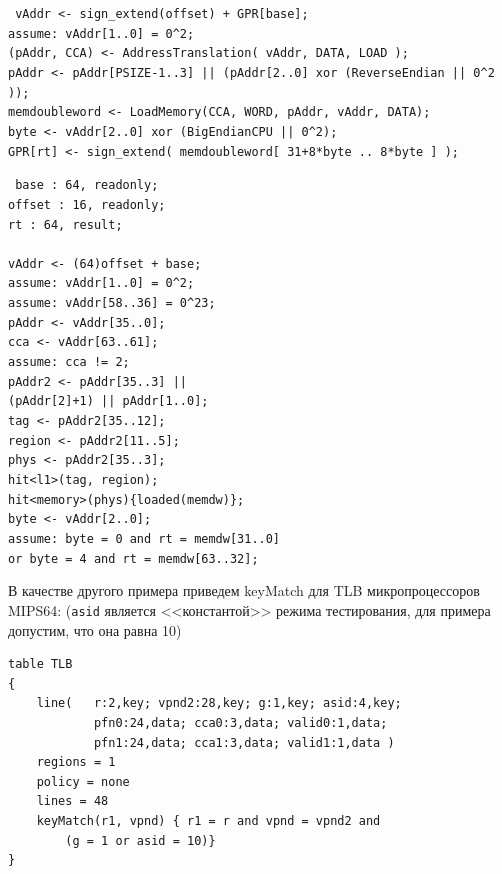 \documentclass[14pt]{extreport}
\begin{document}
\noindent\parbox{0.4\textwidth}{ \footnotesize \tt
vAddr <- sign\_extend(offset) + GPR[base];\\
assume: vAddr[1..0] = 0\^{}2;\\
(pAddr, CCA) <- AddressTranslation( vAddr, DATA, LOAD );\\
pAddr <- pAddr[PSIZE-1..3] || (pAddr[2..0] xor (ReverseEndian || 0\^{}2 ));\\
memdoubleword <- LoadMemory(CCA, WORD, pAddr, vAddr, DATA);\\
byte <- vAddr[2..0] xor (BigEndianCPU || 0\^{}2);\\
GPR[rt] <- sign\_extend( memdoubleword[ 31+8*byte .. 8*byte ] );\\
} \parbox{0.1\textwidth}{ \quad
} \parbox{0.5\textwidth}{ \footnotesize \tt
base : 64, readonly;\\
offset : 16, readonly;\\
rt : 64, result;\\
\\
vAddr <- (64)offset + base;\\
assume: vAddr[1..0] = 0\^{}2;\\
assume: vAddr[58..36] = 0\^{}23;\\
pAddr <- vAddr[35..0];\\
cca <- vAddr[63..61];\\
assume: cca != 2;\\
pAddr2 <- pAddr[35..3] ||\\
\indent\hspace{1cm}(pAddr[2]+1) || pAddr[1..0];\\
tag <- pAddr2[35..12];\\
region <- pAddr2[11..5];\\
phys <- pAddr2[35..3];\\
hit<l1>(tag, region);\\
hit<memory>(phys)\{loaded(memdw)\};\\
byte <- vAddr[2..0];\\
assume: byte = 0 and rt = memdw[31..0]\\
\indent\hspace{1cm}or byte = 4 and rt = memdw[63..32];\\}

В качестве другого примера приведем keyMatch для TLB микропроцессоров MIPS64: (\texttt{asid} является <<константой>> режима тестирования, для примера допустим, что она равна 10)
\begin{verbatim}
table TLB
{
    line(   r:2,key; vpnd2:28,key; g:1,key; asid:4,key;
            pfn0:24,data; cca0:3,data; valid0:1,data;
            pfn1:24,data; cca1:3,data; valid1:1,data )
    regions = 1
    policy = none
    lines = 48
    keyMatch(r1, vpnd) { r1 = r and vpnd = vpnd2 and
        (g = 1 or asid = 10)}
}
\end{verbatim}
\end{document}
